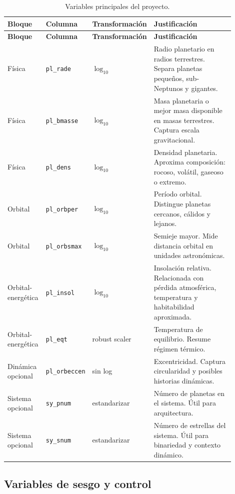 \documentclass[11pt,letterpaper]{article}
\begin{document}
\begin{longtable}{p{0.17\linewidth}p{0.18\linewidth}p{0.17\linewidth}p{0.38\linewidth}}
\caption{Variables principales del proyecto.}\\
\toprule
\textbf{Bloque} & \textbf{Columna} & \textbf{Transformación} & \textbf{Justificación} \\
\midrule
\endfirsthead
\toprule
\textbf{Bloque} & \textbf{Columna} & \textbf{Transformación} & \textbf{Justificación} \\
\midrule
\endhead
Física & \texttt{pl\_rade} & $\log_{10}$ & Radio planetario en radios terrestres. Separa planetas pequeños, sub-Neptunos y gigantes. \\
Física & \texttt{pl\_bmasse} & $\log_{10}$ & Masa planetaria o mejor masa disponible en masas terrestres. Captura escala gravitacional. \\
Física & \texttt{pl\_dens} & $\log_{10}$ & Densidad planetaria. Aproxima composición: rocoso, volátil, gaseoso o extremo. \\
Orbital & \texttt{pl\_orbper} & $\log_{10}$ & Período orbital. Distingue planetas cercanos, cálidos y lejanos. \\
Orbital & \texttt{pl\_orbsmax} & $\log_{10}$ & Semieje mayor. Mide distancia orbital en unidades astronómicas. \\
Orbital-energética & \texttt{pl\_insol} & $\log_{10}$ & Insolación relativa. Relacionada con pérdida atmosférica, temperatura y habitabilidad aproximada. \\
Orbital-energética & \texttt{pl\_eqt} & robust scaler & Temperatura de equilibrio. Resume régimen térmico. \\
Dinámica opcional & \texttt{pl\_orbeccen} & sin log & Excentricidad. Captura circularidad y posibles historias dinámicas. \\
Sistema opcional & \texttt{sy\_pnum} & estandarizar & Número de planetas en el sistema. Útil para arquitectura. \\
Sistema opcional & \texttt{sy\_snum} & estandarizar & Número de estrellas del sistema. Útil para binariedad y contexto dinámico. \\
\bottomrule
\end{longtable}

\subsection{Variables de sesgo y control}
\end{document}
